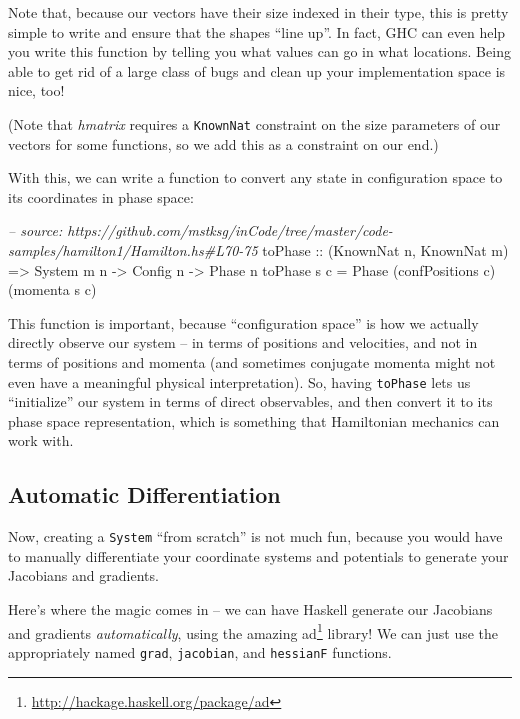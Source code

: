 \documentclass[]{article}
\newenvironment{Shaded}{}{}
\newcommand{\DataTypeTok}[1]{\textcolor[rgb]{0.56,0.13,0.00}{#1}}
\newcommand{\CommentTok}[1]{\textcolor[rgb]{0.38,0.63,0.69}{\textit{#1}}}
\newcommand{\OtherTok}[1]{\textcolor[rgb]{0.00,0.44,0.13}{#1}}
\newcommand{\FunctionTok}[1]{\textcolor[rgb]{0.02,0.16,0.49}{#1}}
\newcommand{\NormalTok}[1]{#1}
\renewcommand{\href}[2]{#2\footnote{\url{#1}}}
\begin{document}
Note that, because our vectors have their size indexed in their type, this is
pretty simple to write and ensure that the shapes ``line up''. In fact, GHC can
even help you write this function by telling you what values can go in what
locations. Being able to get rid of a large class of bugs and clean up your
implementation space is nice, too!

(Note that \emph{hmatrix} requires a \texttt{KnownNat} constraint on the size
parameters of our vectors for some functions, so we add this as a constraint on
our end.)

With this, we can write a function to convert any state in configuration space
to its coordinates in phase space:

\begin{Shaded}
\begin{Highlighting}[]
\CommentTok{-- source: https://github.com/mstksg/inCode/tree/master/code-samples/hamilton1/Hamilton.hs#L70-75}
\NormalTok{toPhase}
\OtherTok{    ::}\NormalTok{ (}\DataTypeTok{KnownNat}\NormalTok{ n, }\DataTypeTok{KnownNat}\NormalTok{ m)}
    \OtherTok{=>} \DataTypeTok{System}\NormalTok{ m n}
    \OtherTok{->} \DataTypeTok{Config}\NormalTok{ n}
    \OtherTok{->} \DataTypeTok{Phase}\NormalTok{ n}
\NormalTok{toPhase s c }\FunctionTok{=} \DataTypeTok{Phase}\NormalTok{ (confPositions c) (momenta s c)}
\end{Highlighting}
\end{Shaded}

This function is important, because ``configuration space'' is how we actually
directly observe our system -- in terms of positions and velocities, and not in
terms of positions and momenta (and sometimes conjugate momenta might not even
have a meaningful physical interpretation). So, having \texttt{toPhase} lets us
``initialize'' our system in terms of direct observables, and then convert it to
its phase space representation, which is something that Hamiltonian mechanics
can work with.

\subsection{Automatic Differentiation}\label{automatic-differentiation}

Now, creating a \texttt{System} ``from scratch'' is not much fun, because you
would have to manually differentiate your coordinate systems and potentials to
generate your Jacobians and gradients.

Here's where the magic comes in -- we can have Haskell generate our Jacobians
and gradients \emph{automatically}, using the amazing
\href{http://hackage.haskell.org/package/ad}{ad} library! We can just use the
appropriately named \texttt{grad}, \texttt{jacobian}, and \texttt{hessianF}
functions.
\end{document}
